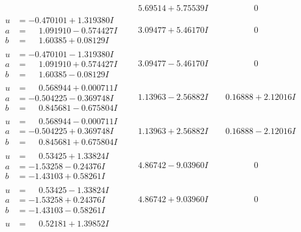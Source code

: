 \documentclass[1p]{elsarticle_modified}
\theoremstyle{definition}
\begin{document}
$$\begin{array}{c|c|c}
 & \phantom{-}5.69514 + 5.75539 I & \phantom{-0.000000 } 0 \\ \hline\begin{aligned}
u &= -0.470101 + 1.319380 I \\
a &= \phantom{-}1.091910 - 0.574427 I \\
b &= \phantom{-}1.60385 + 0.08129 I\end{aligned}
 & \phantom{-}3.09477 + 5.46170 I & \phantom{-0.000000 } 0 \\ \hline\begin{aligned}
u &= -0.470101 - 1.319380 I \\
a &= \phantom{-}1.091910 + 0.574427 I \\
b &= \phantom{-}1.60385 - 0.08129 I\end{aligned}
 & \phantom{-}3.09477 - 5.46170 I & \phantom{-0.000000 } 0 \\ \hline\begin{aligned}
u &= \phantom{-}0.568944 + 0.000711 I \\
a &= -0.504225 - 0.369748 I \\
b &= \phantom{-}0.845681 - 0.675804 I\end{aligned}
 & \phantom{-}1.13963 - 2.56882 I & \phantom{-}0.16888 + 2.12016 I \\ \hline\begin{aligned}
u &= \phantom{-}0.568944 - 0.000711 I \\
a &= -0.504225 + 0.369748 I \\
b &= \phantom{-}0.845681 + 0.675804 I\end{aligned}
 & \phantom{-}1.13963 + 2.56882 I & \phantom{-}0.16888 - 2.12016 I \\ \hline\begin{aligned}
u &= \phantom{-}0.53425 + 1.33824 I \\
a &= -1.53258 - 0.24376 I \\
b &= -1.43103 + 0.58261 I\end{aligned}
 & \phantom{-}4.86742 - 9.03960 I & \phantom{-0.000000 } 0 \\ \hline\begin{aligned}
u &= \phantom{-}0.53425 - 1.33824 I \\
a &= -1.53258 + 0.24376 I \\
b &= -1.43103 - 0.58261 I\end{aligned}
 & \phantom{-}4.86742 + 9.03960 I & \phantom{-0.000000 } 0 \\ \hline\begin{aligned}
u &= \phantom{-}0.52181 + 1.39852 I \\

\end{aligned}
\end{array}$$
\end{document}
